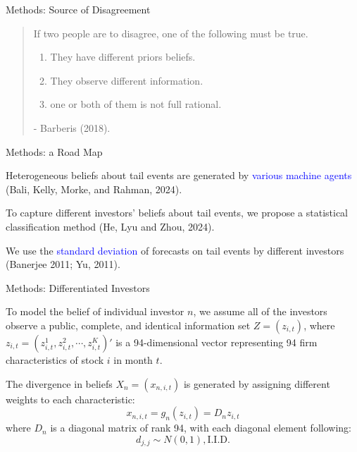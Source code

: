 \documentclass[11pt, aspectratio=169]{beamer}
\newenvironment{wideitemize}{\itemize\addtolength{\itemsep}{10pt}}{\enditemize}
\begin{document}
\begin{frame}{Methods: Source of Disagreement }
    \begin{quote}
    If two people are to disagree, one of the following must be true.
    \bigskip
    \begin{enumerate}
        \item \alert{They have different priors beliefs.}
    \bigskip
        \item They observe different information.
    \bigskip
        \item one or both of them is not full rational.
    \end{enumerate}
    \bigskip
    - Barberis (2018).
    \end{quote}
\end{frame}

\begin{frame}{Methods: a Road Map}
    \bigskip
    \begin{wideitemize}
    \item Heterogeneous beliefs about tail events are generated by \textcolor{blue}{various machine agents} (Bali, Kelly, Morke, and Rahman, 2024).
    
    \item To capture different investors' beliefs about tail events, we propose a statistical \alert{classification} method (He, Lyu and Zhou, 2024).

    \item We use the \textcolor{blue}{standard deviation} of forecasts on tail events by different investors (Banerjee 2011; Yu, 2011).
    \end{wideitemize}
\end{frame}

\begin{frame}{Methods: Differentiated Investors}
    \bigskip
    \begin{wideitemize}
    \item To model the belief of individual investor $n$, we assume all of the investors observe a \alert{public, complete, and identical} information set $Z = (z_{i, t})$, where $z_{i,t}=(z_{i,t}^{1},z_{i,t}^{2},\cdots,z_{i,t}^{K})'$ is a 94-dimensional vector representing 94 firm characteristics of stock $i$ in month $t$. 
    \item The divergence in beliefs $X_{n} = (x_{n,i,t})$ is generated by assigning different weights to each characteristic:
    \begin{equation*}
        x_{n,i,t} = g_n(z_{i,t}) = D_{n}z_{i,t}
    \end{equation*}
    where $D_{n}$ is a diagonal matrix of rank 94, with each diagonal element following:
    \begin{equation*}
        d_{j,j} \sim N(0,1), \text{I.I.D.}
    \end{equation*}
    \end{wideitemize}
\end{frame}
\end{document}
